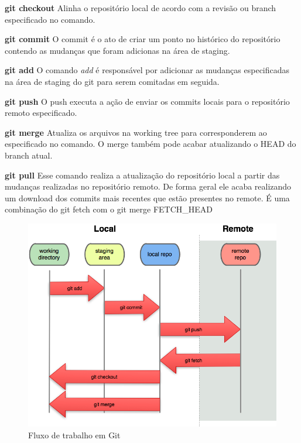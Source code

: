 \documentclass[]{politex}
\begin{document}
	\textbf{git checkout}
	\newline
	Alinha o repositório local de acordo com a revisão ou branch especificado no comando.
	
	\textbf{git commit}
	\newline
	O commit é o ato de criar um ponto no histórico do repositório contendo as mudanças que foram adicionas na área de staging.
	
	\textbf{git add}
	\newline
	O comando \textit{add} é responsável por adicionar as mudanças especificadas na área de staging do git para serem comitadas em seguida.
	
	\textbf{git push}
	\newline
	O push executa a ação de enviar os commits locais para o repositório remoto especificado.
	
	\textbf{git merge}
	\newline
	Atualiza os arquivos na working tree para corresponderem ao especificado no comando. O merge também pode acabar atualizando o HEAD do branch atual.
	
	\textbf{git pull}
	\newline
	Esse comando realiza a atualização do repositório local a partir das mudanças realizadas no repositório remoto. De forma geral ele acaba realizando um download dos commits mais recentes que estão presentes no remote. É uma combinação do git fetch com o git merge FETCH\_HEAD
	
	\begin{figure}[htb]
		\caption{\label{fig_git2}Fluxo de trabalho em Git}
		\begin{center}
		\includegraphics[scale=1]{GIT2.png}
		\end{center}
	\end{figure}
\end{document}
